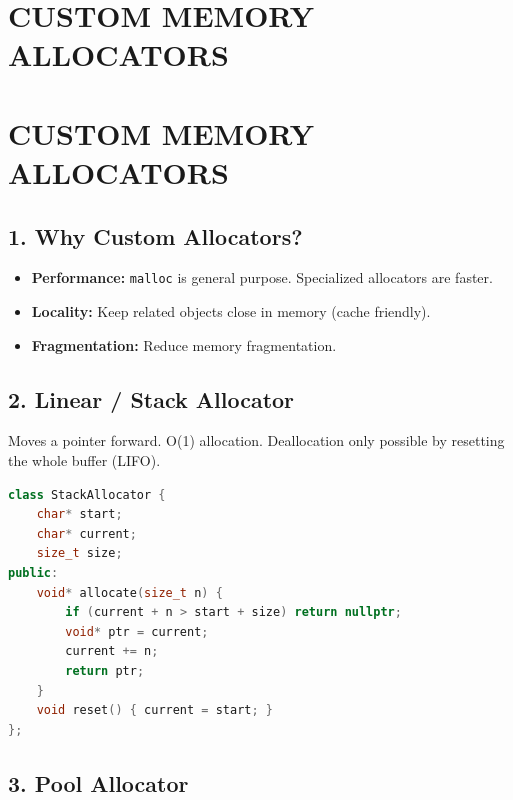 \hypertarget{custom-memory-allocators}{%
\chapter{CUSTOM MEMORY ALLOCATORS}\label{custom-memory-allocators}}

\hypertarget{custom-memory-allocators-1}{%
\chapter{CUSTOM MEMORY ALLOCATORS}\label{custom-memory-allocators-1}}

\hypertarget{why-custom-allocators}{%
\section{1. Why Custom Allocators?}\label{why-custom-allocators}}

\begin{itemize}
\tightlist
\item
  \textbf{Performance:} \passthrough{\lstinline!malloc!} is general
  purpose. Specialized allocators are faster.
\item
  \textbf{Locality:} Keep related objects close in memory (cache
  friendly).
\item
  \textbf{Fragmentation:} Reduce memory fragmentation.
\end{itemize}

\hypertarget{linear-stack-allocator}{%
\section{2. Linear / Stack Allocator}\label{linear-stack-allocator}}

Moves a pointer forward. O(1) allocation. Deallocation only possible by
resetting the whole buffer (LIFO).

\begin{lstlisting}[language={C++}]
class StackAllocator {
    char* start;
    char* current;
    size_t size;
public:
    void* allocate(size_t n) {
        if (current + n > start + size) return nullptr;
        void* ptr = current;
        current += n;
        return ptr;
    }
    void reset() { current = start; }
};
\end{lstlisting}

\hypertarget{pool-allocator}{%
\section{3. Pool Allocator}\label{pool-allocator}}

